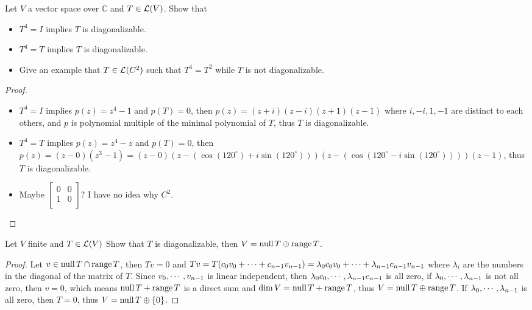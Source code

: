 \documentclass[../main.tex]{subfiles}
\begin{document}
\begin{exercise}
  Let $V$ a vector space over $\mathbb{C}$ and $T \in \mathcal{L}(V)$.
  Show that
  \begin{itemize}
    \item $T^4 = I$ implies $T$ is diagonalizable.
    \item $T^4 = T$ implies $T$ is diagonalizable.
    \item Give an example that $T \in \mathcal{L}(C^2)$ such that $T^4 = T^2$ while $T$ is not diagonalizable.
  \end{itemize}
\end{exercise}
\begin{proof}
  ~
  \begin{itemize}
    \item $T^4 = I$ implies $p(z) = z^4 - 1$ and $p(T) = 0$, then $p(z) = (z + i)(z - i)(z + 1)(z - 1)$
          where $i, -i, 1, -1$ are distinct to each others, and $p$ is polynomial multiple of the minimal polynomial of $T$,
          thus $T$ is diagonalizable.
    \item $T^4 = T$ implies $p(z) = z^4 - z$ and $p(T) = 0$,
          then $p(z) = (z - 0)(z^3 - 1) = (z - 0)(z - (\cos(120^\circ) + i \sin(120^\circ)))(z - (\cos(120^\circ - i \sin(120^\circ))))(z - 1)$,
          thus $T$ is diagonalizable.
    \item Maybe $\begin{bmatrix}
      0 & 0 \\
      1 & 0 \\
    \end{bmatrix}$? I have no idea why $C^2$.
  \end{itemize}
\end{proof}

\setcounter{exercise}{2}
\begin{exercise}
  Let $V$ finite and $T \in \mathcal{L}(V)$ Show that $T$ is diagonalizable, then $V = \operatorname{null} T \oplus \operatorname{range} T$.
\end{exercise}
\begin{proof}
  Let $v \in \operatorname{null} T \cap \operatorname{range} T$,
  then $Tv = 0$ and $Tv = T(c_0 v_0 + \cdots + c_{n - 1} v_{n - 1}) = \lambda_0 c_0 v_0 + \cdots + \lambda_{n - 1}c_{n - 1}v_{n - 1}$
  where $\lambda_i$ are the numbers in the diagonal of the matrix of $T$.
  Since $v_0 , \cdots , v_{n - 1}$ is linear independent, then $\lambda_0 c_0 , \cdots , \lambda_{n - 1} c_{n - 1}$
  is all zero, if $\lambda_0 , \cdots , \lambda_{n - 1}$ is not all zero, then $v = 0$,
  which means $\operatorname{null} T + \operatorname{range} T$  is a direct sum and $\dim V = \operatorname{null} T + \operatorname{range} T$,
  thus $V = \operatorname{null} T \oplus \operatorname{range} T$.
  If $\lambda_0 , \cdots , \lambda_{n - 1}$ is all zero, then $T = 0$, thus $V = \operatorname{null} T \oplus \{0\}$.
\end{proof}
\end{document}
